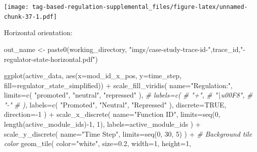 \documentclass[
]{book}
\newenvironment{Shaded}{\begin{snugshade}}{\end{snugshade}}
\newcommand{\AttributeTok}[1]{\textcolor[rgb]{0.77,0.63,0.00}{#1}}
\newcommand{\CommentTok}[1]{\textcolor[rgb]{0.56,0.35,0.01}{\textit{#1}}}
\newcommand{\ConstantTok}[1]{\textcolor[rgb]{0.00,0.00,0.00}{#1}}
\newcommand{\DecValTok}[1]{\textcolor[rgb]{0.00,0.00,0.81}{#1}}
\newcommand{\FloatTok}[1]{\textcolor[rgb]{0.00,0.00,0.81}{#1}}
\newcommand{\FunctionTok}[1]{\textcolor[rgb]{0.00,0.00,0.00}{#1}}
\newcommand{\NormalTok}[1]{#1}
\newcommand{\OtherTok}[1]{\textcolor[rgb]{0.56,0.35,0.01}{#1}}
\newcommand{\SpecialCharTok}[1]{\textcolor[rgb]{0.00,0.00,0.00}{#1}}
\newcommand{\StringTok}[1]{\textcolor[rgb]{0.31,0.60,0.02}{#1}}
\begin{document}
\texttt{[image: tag-based-regulation-supplemental\_files/figure-latex/unnamed-chunk-37-1.pdf]}

Horizontal orientation:

\begin{Shaded}
\begin{Highlighting}[]
\NormalTok{out\_name }\OtherTok{\textless{}{-}} \FunctionTok{paste0}\NormalTok{(working\_directory, }\StringTok{"imgs/case{-}study{-}trace{-}id{-}"}\NormalTok{,trace\_id,}\StringTok{"{-}regulator{-}state{-}horizontal.pdf"}\NormalTok{)}

\FunctionTok{ggplot}\NormalTok{(active\_data, }\FunctionTok{aes}\NormalTok{(}\AttributeTok{x=}\NormalTok{mod\_id\_x\_pos, }\AttributeTok{y=}\NormalTok{time\_step, }\AttributeTok{fill=}\NormalTok{regulator\_state\_simplified)) }\SpecialCharTok{+}
  \FunctionTok{scale\_fill\_viridis}\NormalTok{(}
    \AttributeTok{name=}\StringTok{"Regulation:"}\NormalTok{,}
    \AttributeTok{limits=}\FunctionTok{c}\NormalTok{(}
      \StringTok{"promoted"}\NormalTok{,}
      \StringTok{"neutral"}\NormalTok{,}
      \StringTok{"repressed"}
\NormalTok{    ),}
    \CommentTok{\# labels=c(}
    \CommentTok{\#   "+",}
    \CommentTok{\#   "\textbackslash{}u00F8",}
    \CommentTok{\#   "{-}"}
    \CommentTok{\# ),}
    \AttributeTok{labels=}\FunctionTok{c}\NormalTok{(}
      \StringTok{"Promoted"}\NormalTok{,}
      \StringTok{"Neutral"}\NormalTok{,}
      \StringTok{"Repressed"}
\NormalTok{    ),}
    \AttributeTok{discrete=}\ConstantTok{TRUE}\NormalTok{,}
    \AttributeTok{direction=}\SpecialCharTok{{-}}\DecValTok{1}
\NormalTok{  ) }\SpecialCharTok{+}
  \FunctionTok{scale\_x\_discrete}\NormalTok{(}
    \AttributeTok{name=}\StringTok{"Function ID"}\NormalTok{,}
    \AttributeTok{limits=}\FunctionTok{seq}\NormalTok{(}\DecValTok{0}\NormalTok{, }\FunctionTok{length}\NormalTok{(active\_module\_ids)}\SpecialCharTok{{-}}\DecValTok{1}\NormalTok{, }\DecValTok{1}\NormalTok{),}
    \AttributeTok{labels=}\NormalTok{active\_module\_ids}
\NormalTok{  ) }\SpecialCharTok{+}
  \FunctionTok{scale\_y\_discrete}\NormalTok{(}
    \AttributeTok{name=}\StringTok{"Time Step"}\NormalTok{,}
    \AttributeTok{limits=}\FunctionTok{seq}\NormalTok{(}\DecValTok{0}\NormalTok{, }\DecValTok{30}\NormalTok{, }\DecValTok{5}\NormalTok{)}
\NormalTok{  ) }\SpecialCharTok{+}
  \CommentTok{\# Background tile color}
  \FunctionTok{geom\_tile}\NormalTok{(}
    \AttributeTok{color=}\StringTok{"white"}\NormalTok{,}
    \AttributeTok{size=}\FloatTok{0.2}\NormalTok{,}
    \AttributeTok{width=}\DecValTok{1}\NormalTok{,}
    \AttributeTok{height=}\DecValTok{1}\NormalTok{,}

\end{Highlighting}
\end{Shaded}
\end{document}
